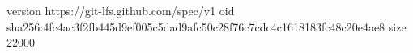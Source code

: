 version https://git-lfs.github.com/spec/v1
oid sha256:4fc4ac3f2fb445d9ef005c5dad9afc50c28f76c7cdc4c1618183fc48c20e4ae8
size 22000
